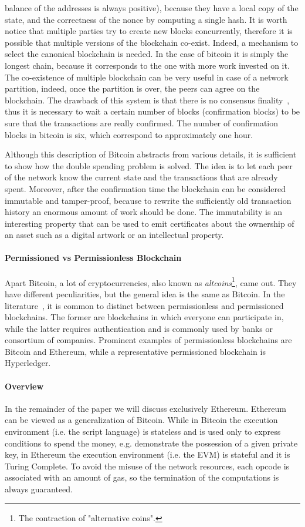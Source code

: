 balance of the addresses is always positive), because they have a local copy of
the state, and the correctness of the nonce by computing a single hash. It is
worth notice that multiple parties try to create new blocks concurrently,
therefore it is possible that multiple versions of the blockchain co-exist.
Indeed, a mechanism to select the canonical blockchain is needed. In the case of
bitcoin it is simply the longest chain, because it corresponds to the one with
more work invested on it. The co-existence of multiple blockchain can be very
useful in case of a network partition, indeed, once the partition is over, the
peers can agree on the blockchain. The drawback of this system is that there is
no consensus finality~\cite{bib:the-quest}, thus it is necessary to wait a
certain number of blocks (confirmation blocks) to be sure that the transactions
are really confirmed. The number of confirmation blocks in bitcoin is six, which
correspond to approximately one hour.

Although this description of Bitcoin abstracts from various details, it is
sufficient to show how the double spending problem is solved. The idea is to let
each peer of the network know the current state and the transactions that are
already spent. Moreover, after the confirmation time the blockchain can be
considered immutable and tamper-proof, because to rewrite the sufficiently old
transaction history an enormous amount of work should be done. The immutability
is an interesting property that can be used to emit certificates about the
ownership of an asset such as a digital artwork or an intellectual property.

\paragraph{Permissioned vs Permissionless Blockchain}
Apart Bitcoin, a lot of cryptocurrencies, also known as
\emph{altcoins}\footnote{The contraction of "alternative coins".}, came out.
They have different peculiarities, but the general idea is the same as Bitcoin.
In the literature~\cite{bib:the-quest}, it is common to distinct between
permissionless and permissioned blockchains. The former are blockchains in which
everyone can participate in, while the latter requires authentication and is
commonly used by banks or consortium of companies. Prominent examples of
permissionless blockchains are Bitcoin and Ethereum, while a representative
permissioned blockchain is Hyperledger.

\paragraph{Overview}
In the remainder of the paper we will discuss exclusively Ethereum. Ethereum can
be viewed as a generalization of Bitcoin. While in Bitcoin the execution
environment (i.e. the script language) is stateless and is used only to express
conditions to spend the money, e.g. demonstrate the possession of a given
private key, in Ethereum the execution environment (i.e. the EVM) is stateful
and it is Turing Complete. To avoid the misuse of the network resources, each
opcode is associated with an amount of gas, so the termination of the
computations is always guaranteed.

